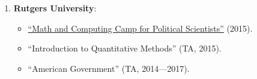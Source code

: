 \begin{enumerate}
\item {\bf Rutgers University}:

    \begin{itemize}
      \item[\textcolor{gray}{\textbullet}] \href{http://github.com/hbahamonde/Math-Camp/raw/master/Syllabus/Math_Camp_Syllabus.pdf/}{``Math and Computing Camp for Political Scientists''} (2015).
      
      \item[\textcolor{gray}{\textbullet}] ``Introduction to Quantitative Methods'' (TA, 2015).
      
      \item[\textcolor{gray}{\textbullet}] ``American Government'' (TA, 2014---2017).
    \end{itemize}

\end{enumerate}